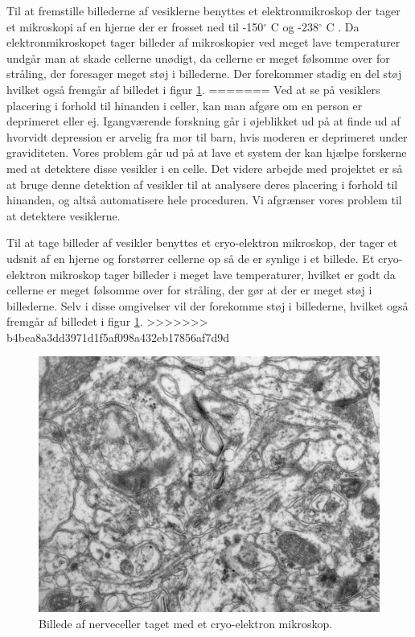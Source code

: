 Til at fremstille billederne af vesiklerne benyttes et elektronmikroskop der tager et mikroskopi af en hjerne der er frosset ned til -150$^\circ$ C og -238$^\circ$ C .
Da elektronmikroskopet tager billeder af mikroskopier ved meget lave temperaturer undgår man at skade cellerne unødigt, da cellerne er meget følsomme over for stråling, der foresager meget støj i billederne. Der forekommer stadig en del støj hvilket også fremgår af billedet i figur \ref{fig:intro_celler}.
=======
Ved at se på vesiklers placering i forhold til hinanden i celler, kan man afgøre om en person er deprimeret eller ej. Igangværende forskning går i øjeblikket ud på at finde ud af hvorvidt depression er arvelig fra mor til barn, hvis moderen er deprimeret under graviditeten. Vores problem går ud på at lave et system der kan hjælpe forskerne med at detektere disse vesikler i en celle. Det videre arbejde med projektet er så at bruge denne detektion af vesikler til at analysere deres placering i forhold til hinanden, og altså automatisere hele proceduren. Vi afgrænser vores problem til at detektere vesiklerne.

Til at tage billeder af vesikler benyttes et cryo-elektron mikroskop, der tager et udsnit af en hjerne og forstørrer cellerne op så de er synlige i et billede. Et cryo-elektron mikroskop tager billeder i meget lave temperaturer, hvilket er godt da cellerne er meget følsomme over for stråling, der gør at der er meget støj i billederne. Selv i disse omgivelser vil der forekomme støj i billederne, hvilket også fremgår af billedet i figur \ref{fig:intro_celler}.
>>>>>>> b4bea8a3dd3971d1f5af098a432eb17856af7d9d

\begin{figure}[H]
	\centering
	\includegraphics[scale=0.5]{files/intro/img/celler.jpg}
	\caption{Billede af nerveceller taget med et cryo-elektron mikroskop.\label{fig:intro_celler}}
\end{figure}

